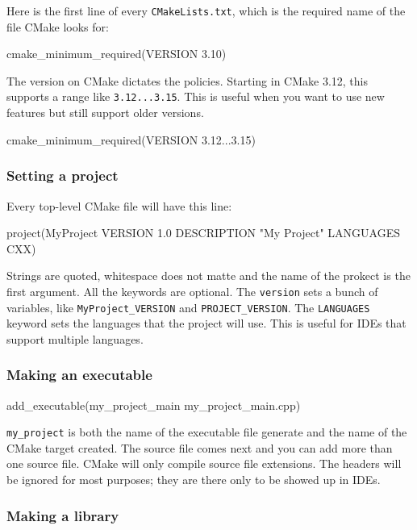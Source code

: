 Here is the first line of every \texttt{CMakeLists.txt}, which is the required name of the file CMake looks for:
\begin{codeblock}[language=bash]
cmake_minimum_required(VERSION 3.10)
\end{codeblock}
The version on CMake dictates the policies. Starting in CMake 3.12, this supports
a range like \texttt{3.12...3.15}. This is useful when you want to use new features but still support older versions.
\begin{codeblock}[language=bash]
cmake_minimum_required(VERSION 3.12...3.15)
\end{codeblock}

\subsubsection{Setting a project}
Every top-level CMake file will have this line:
\begin{codeblock}[language=bash]
project(MyProject VERSION 1.0
    DESCRIPTION "My Project"
    LANGUAGES CXX)
\end{codeblock}

Strings are quoted, whitespace does not matte and the name of the prokect is the first argument.
All the keywords are optional. The \texttt{version} sets a bunch of variables, like \texttt{MyProject\_VERSION} 
and \texttt{PROJECT\_VERSION}. The \texttt{LANGUAGES} keyword sets the languages that the project will use. This is useful for IDEs that support multiple languages.

\subsubsection{Making an executable}

\begin{codeblock}[language=bash]
add_executable(my_project_main my_project_main.cpp)
\end{codeblock}

\texttt{my\_project} is both the name of the executable file generate and the name of the CMake target created.
The source file comes next and you can add more than one source file. CMake will only compile source file extensions. 
The headers will be ignored for most purposes; they are there only to be showed up in IDEs.

\subsubsection{Making a library}

